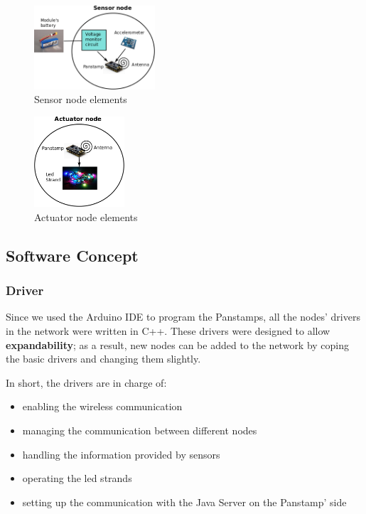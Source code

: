 \begin{figure}[h!]
 \centering
 \includegraphics[width= 0.4\textwidth, clip=true  ,keepaspectratio=true]{./graph/sensor_node.png}
 \caption{Sensor node elements}
 \label{fig:sensor-node}
\end{figure}


\begin{figure}[h!]
 \centering
 \includegraphics[width= 0.3\textwidth, clip=true  ,keepaspectratio=true]{./graph/actuator_node.png}
 \caption{Actuator node elements}
 \label{fig:actuator-node}
\end{figure}


\subsection{Software Concept} 

\subsubsection{Driver} 
Since we used the Arduino IDE to program the Panstamps, all the nodes' drivers in the network were written in C++. These drivers were designed to allow \textbf{expandability}; as a result, new nodes can be added to the network by coping the basic drivers and changing them slightly. 

In short, the drivers are in charge of:
\begin{itemize}
\item enabling the wireless communication
\item managing the communication between different nodes
\item handling the information provided by sensors 
\item operating the led strands
\item setting up the communication with the Java Server on the Panstamp' side
\end{itemize}

